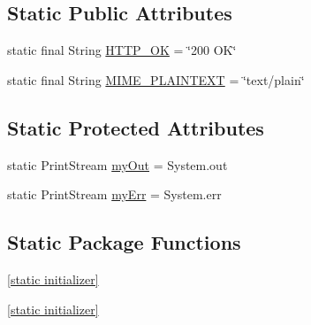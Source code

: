 \subsection*{\-Static \-Public \-Attributes}
\begin{DoxyCompactItemize}
\item 
static final \-String \hyperlink{classcom_1_1axcoto_1_1shinjuku_1_1maki_1_1_nano_h_t_t_p_d_a95079636bd1a20b90ed2c75dfb3998be}{\-H\-T\-T\-P\-\_\-\-O\-K} = \char`\"{}200 \-O\-K\char`\"{}
\item 
static final \-String \hyperlink{classcom_1_1axcoto_1_1shinjuku_1_1maki_1_1_nano_h_t_t_p_d_a5a7650102fc857b64990fb73383f59a5}{\-M\-I\-M\-E\-\_\-\-P\-L\-A\-I\-N\-T\-E\-X\-T} = \char`\"{}text/plain\char`\"{}
\end{DoxyCompactItemize}
\subsection*{\-Static \-Protected \-Attributes}
\begin{DoxyCompactItemize}
\item 
static \-Print\-Stream \hyperlink{classcom_1_1axcoto_1_1shinjuku_1_1maki_1_1_nano_h_t_t_p_d_ac2fd4a658e551e440d2bced445107375}{my\-Out} = \-System.\-out
\item 
static \-Print\-Stream \hyperlink{classcom_1_1axcoto_1_1shinjuku_1_1maki_1_1_nano_h_t_t_p_d_afc323da221d2fb3f010b994ccc70a31f}{my\-Err} = \-System.\-err
\end{DoxyCompactItemize}
\subsection*{\-Static \-Package \-Functions}
\begin{DoxyCompactItemize}
\item 
\hyperlink{classcom_1_1axcoto_1_1shinjuku_1_1maki_1_1_nano_h_t_t_p_d_a2e87c5ede6b7235170d287cd2e254454}{\mbox{[}static initializer\mbox{]}}
\item 
\hyperlink{classcom_1_1axcoto_1_1shinjuku_1_1maki_1_1_nano_h_t_t_p_d_a2e87c5ede6b7235170d287cd2e254454}{\mbox{[}static initializer\mbox{]}}
\end{DoxyCompactItemize}
